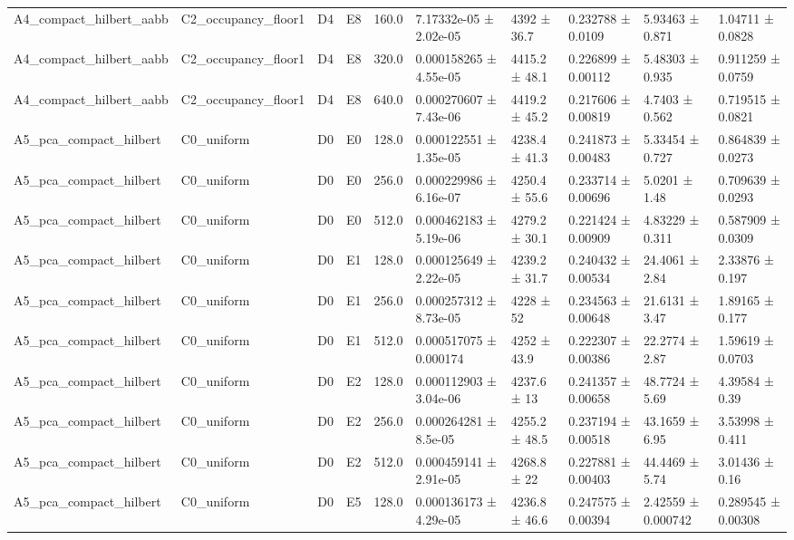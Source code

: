 \begin{table}
\begin{tabular}{llllllllll}
A4\_compact\_hilbert\_aabb & C2\_occupancy\_floor1 & D4 & E8 & 160.0 & 7.17332e-05 ± 2.02e-05 & 4392 ± 36.7 & 0.232788 ± 0.0109 & 5.93463 ± 0.871 & 1.04711 ± 0.0828 \\
A4\_compact\_hilbert\_aabb & C2\_occupancy\_floor1 & D4 & E8 & 320.0 & 0.000158265 ± 4.55e-05 & 4415.2 ± 48.1 & 0.226899 ± 0.00112 & 5.48303 ± 0.935 & 0.911259 ± 0.0759 \\
A4\_compact\_hilbert\_aabb & C2\_occupancy\_floor1 & D4 & E8 & 640.0 & 0.000270607 ± 7.43e-06 & 4419.2 ± 45.2 & 0.217606 ± 0.00819 & 4.7403 ± 0.562 & 0.719515 ± 0.0821 \\
A5\_pca\_compact\_hilbert & C0\_uniform & D0 & E0 & 128.0 & 0.000122551 ± 1.35e-05 & 4238.4 ± 41.3 & 0.241873 ± 0.00483 & 5.33454 ± 0.727 & 0.864839 ± 0.0273 \\
A5\_pca\_compact\_hilbert & C0\_uniform & D0 & E0 & 256.0 & 0.000229986 ± 6.16e-07 & 4250.4 ± 55.6 & 0.233714 ± 0.00696 & 5.0201 ± 1.48 & 0.709639 ± 0.0293 \\
A5\_pca\_compact\_hilbert & C0\_uniform & D0 & E0 & 512.0 & 0.000462183 ± 5.19e-06 & 4279.2 ± 30.1 & 0.221424 ± 0.00909 & 4.83229 ± 0.311 & 0.587909 ± 0.0309 \\
A5\_pca\_compact\_hilbert & C0\_uniform & D0 & E1 & 128.0 & 0.000125649 ± 2.22e-05 & 4239.2 ± 31.7 & 0.240432 ± 0.00534 & 24.4061 ± 2.84 & 2.33876 ± 0.197 \\
A5\_pca\_compact\_hilbert & C0\_uniform & D0 & E1 & 256.0 & 0.000257312 ± 8.73e-05 & 4228 ± 52 & 0.234563 ± 0.00648 & 21.6131 ± 3.47 & 1.89165 ± 0.177 \\
A5\_pca\_compact\_hilbert & C0\_uniform & D0 & E1 & 512.0 & 0.000517075 ± 0.000174 & 4252 ± 43.9 & 0.222307 ± 0.00386 & 22.2774 ± 2.87 & 1.59619 ± 0.0703 \\
A5\_pca\_compact\_hilbert & C0\_uniform & D0 & E2 & 128.0 & 0.000112903 ± 3.04e-06 & 4237.6 ± 13 & 0.241357 ± 0.00658 & 48.7724 ± 5.69 & 4.39584 ± 0.39 \\
A5\_pca\_compact\_hilbert & C0\_uniform & D0 & E2 & 256.0 & 0.000264281 ± 8.5e-05 & 4255.2 ± 48.5 & 0.237194 ± 0.00518 & 43.1659 ± 6.95 & 3.53998 ± 0.411 \\
A5\_pca\_compact\_hilbert & C0\_uniform & D0 & E2 & 512.0 & 0.000459141 ± 2.91e-05 & 4268.8 ± 22 & 0.227881 ± 0.00403 & 44.4469 ± 5.74 & 3.01436 ± 0.16 \\
A5\_pca\_compact\_hilbert & C0\_uniform & D0 & E5 & 128.0 & 0.000136173 ± 4.29e-05 & 4236.8 ± 46.6 & 0.247575 ± 0.00394 & 2.42559 ± 0.000742 & 0.289545 ± 0.00308 \\

\end{tabular}
\end{table}

